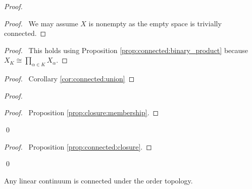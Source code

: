 \begin{proof}
  \pf
  \begin{proof}
    \pf\ We may assume $X$ is nonempty as the empty space is trivially connected.
  \end{proof}
  \begin{proof}
    \pf\ This holds  using Proposition \ref{prop:connected:binary_product} because $X_K \cong \prod_{\alpha \in K} X_\alpha$.
  \end{proof}
  \begin{proof}
    \pf\ Corollary \ref{cor:connected:union}
  \end{proof}
  \begin{proof}
    \qedstep
    \begin{proof}
      \pf\ Proposition \ref{prop:closure:membership}.
    \end{proof}
    \qed
  \end{proof}
  \begin{proof}
    \pf\ Proposition \ref{prop:connected:closure}.
  \end{proof}
  \qed
\end{proof}

\begin{prop}
  Any linear continuum is connected under the order topology.
\end{prop}

